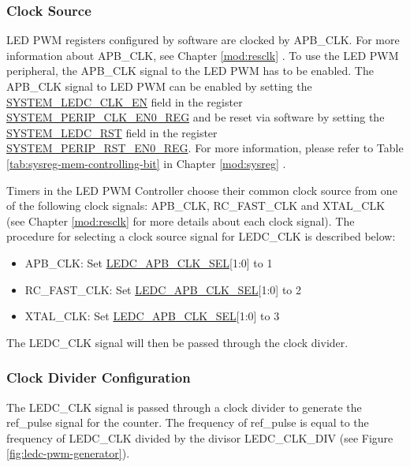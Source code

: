 \documentclass[main\_\_EN.tex]{subfiles}
\begin{document}
\subsubsection{Clock Source}
LED PWM registers configured by software are clocked by APB\_CLK. For more information about APB\_CLK, see Chapter \ref{mod:resclk} \textit{}. To use the LED PWM peripheral, the APB\_CLK signal to the LED PWM has to be enabled. The APB\_CLK signal to LED PWM can be enabled by setting the  \hyperref[fielddesc:SYSTEMLEDCCLKEN]{SYSTEM\_LEDC\_CLK\_EN} field in the register \hyperref[regdesc:SYSTEMPERIPCLKEN0REG]{SYSTEM\_PERIP\_CLK\_EN0\_REG} and be reset via software by setting the \hyperref[fielddesc:SYSTEMLEDCRST]{SYSTEM\_LEDC\_RST} field in the register \hyperref[regdesc:SYSTEMPERIPRSTEN0REG]{SYSTEM\_PERIP\_RST\_EN0\_REG}. For more information, please refer to Table \ref{tab:sysreg-mem-controlling-bit} in Chapter \ref{mod:sysreg} \textit{}. 

Timers in the LED PWM Controller choose their common clock source from one of the following clock signals: APB\_CLK, RC\_FAST\_CLK and XTAL\_CLK (see Chapter \ref{mod:resclk} \textit{} for more details about each clock signal). The procedure for selecting a clock source signal for LEDC\_CLK is described below:

\begin{itemize}
    \item APB\_CLK: Set \hyperref[fielddesc:LEDCAPBCLKSEL]{LEDC\_APB\_CLK\_SEL}[1:0] to 1 
    \item RC\_FAST\_CLK: Set \hyperref[fielddesc:LEDCAPBCLKSEL]{LEDC\_APB\_CLK\_SEL}[1:0] to 2 
    \item XTAL\_CLK: Set \hyperref[fielddesc:LEDCAPBCLKSEL]{LEDC\_APB\_CLK\_SEL}[1:0] to 3 

\end{itemize}

The LEDC\_CLK signal will then be passed through the clock divider.

\subsubsection{Clock Divider Configuration}

The LEDC\_CLK signal is passed through a clock divider to generate the ref\_pulse signal for the counter. The frequency of ref\_pulse is equal to the frequency of LEDC\_CLK divided by the divisor LEDC\_CLK\_DIV   (see Figure \ref{fig:ledc-pwm-generator}).
\end{document}
